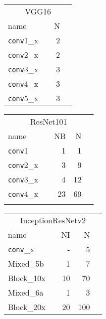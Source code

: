 \documentclass[10pt,twocolumn,letterpaper]{article}
\newcommand{\vv}[1]{{\texttt{#1}}}
\newcommand{\conv}{\vv{conv}}
\begin{document}
\begin{table*}
    \centering
    \footnotesize
    \caption{Base networks architecture details for VGG16, ResNet101 and InceptionResNetv2. Legend: : bottom-up block id, N: number of convolutional filters, NR: number of residual units, NI: number of inception-resnet units, : Resolution and dimensions of the output feature. Refer to~\cite{VGG,resnet,szegedy2016inception,huang2016speed} for details\vspace{0.05in}}
    \label{tab:base_arch}
        \begin{tabular}{@{}lcrr@{}}
        \toprule
        \multicolumn{4}{c}{VGG16}\\
        \arrayrulecolor{gray}
        \midrule
        \arrayrulecolor{black}
        name &  & N & \\
        \midrule
        \conv1\_x &  & 2 & \\
        \conv2\_x &  & 2 & \\
        \conv3\_x &  & 3 & \\
        \conv4\_x &  & 3 & \\
        \conv5\_x &  & 3 & \\
     \bottomrule
        \end{tabular}
    \quad
    \begin{tabular}{@{}lcrrr@{}}
    \toprule
    \multicolumn{5}{c}{ResNet101}\\
    \arrayrulecolor{gray}
    \midrule
    \arrayrulecolor{black}
    name &  & NB & N & \\
    \midrule
    \conv1 &  & 1 & 1 & \\
    \conv2\_x &  & 3 & 9 & \\
    \conv3\_x &  & 4 & 12 & \\
    \conv4\_x &  & 23 & 69 & \\
         \bottomrule
         \\
    \end{tabular}
    \quad
    \begin{tabular}{@{}llrrr@{}}
    \toprule
    \multicolumn{5}{c}{InceptionResNetv2}\\
    \arrayrulecolor{gray}
    \midrule
    \arrayrulecolor{black}
    name &  & NI & N & \\
    \midrule
    \conv\_x &  & -  & 5   & \\
    Mixed\_5b &  & 1  & 7   & \\
    Block\_10x &  & 10  & 70   & \\
    Mixed\_6a &  & 1  & 3   & \\
    Block\_20x &  & 20 & 100 & \\
    \bottomrule
    \end{tabular}
    \vspace{-0.07in}
\end{table*}
\end{document}
